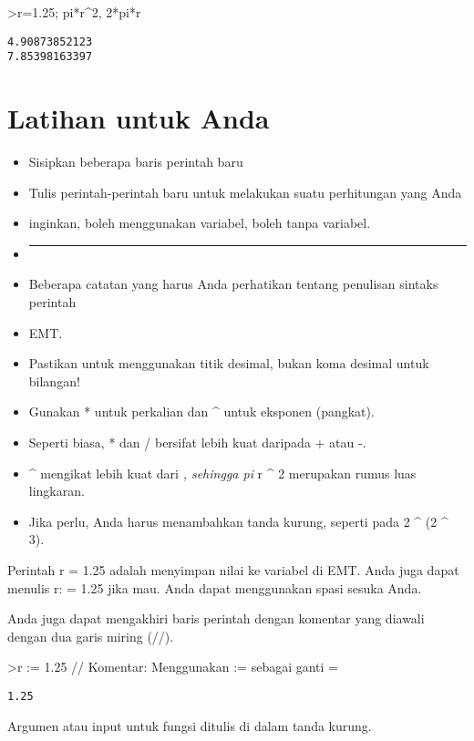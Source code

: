 \documentclass[
]{book}
\begin{document}
\textgreater r=1.25; pi*r\^{}2, 2*pi*r

\begin{verbatim}
4.90873852123
7.85398163397
\end{verbatim}

\section{Latihan untuk Anda}\label{latihan-untuk-anda}

\begin{itemize}
\item
  Sisipkan beberapa baris perintah baru
\item
  Tulis perintah-perintah baru untuk melakukan suatu perhitungan yang Anda
\item
  inginkan, boleh menggunakan variabel, boleh tanpa variabel.
\item
  \begin{center}\rule{0.5\linewidth}{0.5pt}\end{center}
\item
  Beberapa catatan yang harus Anda perhatikan tentang penulisan sintaks perintah
\item
  EMT.
\item
  Pastikan untuk menggunakan titik desimal, bukan koma desimal untuk bilangan!
\item
  Gunakan * untuk perkalian dan \^{} untuk eksponen (pangkat).
\item
  Seperti biasa, * dan / bersifat lebih kuat daripada + atau -.
\item
  \^{} mengikat lebih kuat dari \emph{, sehingga pi } r \^{} 2 merupakan rumus luas lingkaran.
\item
  Jika perlu, Anda harus menambahkan tanda kurung, seperti pada 2 \^{} (2 \^{} 3).
\end{itemize}

Perintah r = 1.25 adalah menyimpan nilai ke variabel di EMT. Anda juga dapat menulis r: = 1.25 jika mau. Anda dapat menggunakan spasi sesuka Anda.

Anda juga dapat mengakhiri baris perintah dengan komentar yang diawali dengan dua garis miring (//).

\textgreater r := 1.25 // Komentar: Menggunakan := sebagai ganti =

\begin{verbatim}
1.25
\end{verbatim}

Argumen atau input untuk fungsi ditulis di dalam tanda kurung.
\end{document}
